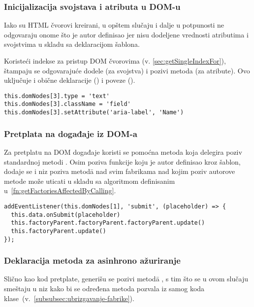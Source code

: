 \subsubsection{Inicijalizacija svojstava i atributa u DOM-u}
\label{subsubsec:init-part-7}

Iako su HTML čvorovi kreirani, u opštem slučaju i dalje u potpunosti ne odgovaraju onome što je autor definisao jer nisu dodeljene vrednosti atributima i svojstvima u skladu sa deklaracijom šablona.

Koristeći indekse za pristup DOM čvorovima (v. \cref{sec:getSingleIndexFor}), štampaju se odgovarajuće dodele (za svojstva) i pozivi metoda (za atribute).
Ovo uključuje i obične deklaracije () i poveze ().

\begin{lstlisting}
this.domNodes[3].type = 'text'
this.domNodes[3].className = 'field'
this.domNodes[3].setAttribute('aria-label', 'Name')
\end{lstlisting}

\subsubsection{Pretplata na događaje iz DOM-a}
\label{subsubsec:pretplata-na-dogadjaje-iz-doma}
\label{subsubsec:init-part-8}

Za pretplatu na DOM događaje koristi se pomoćna metoda koja delegira poziv standardnoj metodi .
Osim poziva funkcije koju je autor definisao kroz šablon, dodaje se i niz poziva metod\=a  nad svim fabrikama nad kojim poziv autorove metode može uticati u skladu sa algoritmom definisanim u~\cref{fn:getFactoriesAffectedByCalling}.

\begin{lstlisting}
addEventListener(this.domNodes[1], 'submit', (placeholder) => {
  this.data.onSubmit(placeholder)
  this.factoryParent.factoryParent.factoryParent.update()
  this.factoryParent.update()
});
\end{lstlisting}

\subsubsection{Deklaracija metoda za asinhrono ažuriranje}
\label{subsubsec:init-part-9}

Slično kao kod pretplate, generišu se pozivi metod\=a , s tim što se u ovom slučaju smeštaju u niz kako bi se određena metoda pozvala iz samog koda klase~(v.~\cref{subsubsec:ubrizgavanje-fabrike}).


